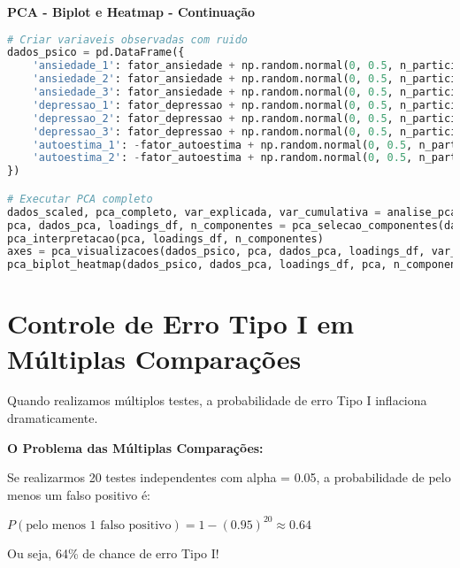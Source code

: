 \begin{researchbox}
\textbf{PCA - Biplot e Heatmap - Continuação}
\begin{lstlisting}[language=Python]
# Criar variaveis observadas com ruido
dados_psico = pd.DataFrame({
    'ansiedade_1': fator_ansiedade + np.random.normal(0, 0.5, n_participantes),
    'ansiedade_2': fator_ansiedade + np.random.normal(0, 0.5, n_participantes),
    'ansiedade_3': fator_ansiedade + np.random.normal(0, 0.5, n_participantes),
    'depressao_1': fator_depressao + np.random.normal(0, 0.5, n_participantes),
    'depressao_2': fator_depressao + np.random.normal(0, 0.5, n_participantes),
    'depressao_3': fator_depressao + np.random.normal(0, 0.5, n_participantes),
    'autoestima_1': -fator_autoestima + np.random.normal(0, 0.5, n_participantes),
    'autoestima_2': -fator_autoestima + np.random.normal(0, 0.5, n_participantes),
})

# Executar PCA completo
dados_scaled, pca_completo, var_explicada, var_cumulativa = analise_pca_completa(dados_psico)
pca, dados_pca, loadings_df, n_componentes = pca_selecao_componentes(dados_psico, dados_scaled, var_explicada, var_cumulativa)
pca_interpretacao(pca, loadings_df, n_componentes)
axes = pca_visualizacoes(dados_psico, pca, dados_pca, loadings_df, var_explicada, var_cumulativa, n_componentes)
pca_biplot_heatmap(dados_psico, dados_pca, loadings_df, pca, n_componentes, axes)
\end{lstlisting}
\end{researchbox}

\section{Controle de Erro Tipo I em Múltiplas Comparações}

Quando realizamos múltiplos testes, a probabilidade de erro Tipo I inflaciona dramaticamente.

\begin{warningbox}
\textbf{O Problema das Múltiplas Comparações:}

Se realizarmos 20 testes independentes com alpha = 0.05, a probabilidade de pelo menos um falso positivo é:

$P(\text{pelo menos 1 falso positivo}) = 1 - (0.95)^{20} \approx 0.64$

Ou seja, 64\% de chance de erro Tipo I!
\end{warningbox}


